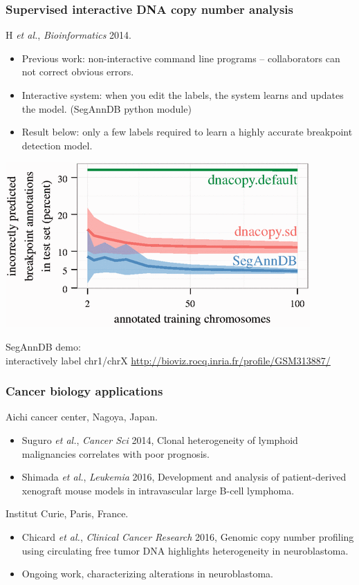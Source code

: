 \documentclass{beamer}
\begin{document}
\begin{frame}
  \frametitle{Supervised interactive DNA copy number analysis}
  H {\it et al.}, {\it Bioinformatics} 2014.

  \begin{itemize}
  \item Previous work: non-interactive command line programs
    -- collaborators can not correct obvious
    errors.
  \item Interactive system: when you edit the labels, the system
    learns and updates the model. (SegAnnDB python module)
  \item Result below: only a few labels required to learn a highly accurate
    breakpoint detection model.
  \end{itemize}
  \begin{minipage}{0.5\linewidth}
    \includegraphics[width=\textwidth]{SegAnnDB-test-error-decreases}
  \end{minipage}
  \begin{minipage}[0.5\linewidth]{0.48\linewidth}
SegAnnDB demo:\\interactively label chr1/chrX
  \url{http://bioviz.rocq.inria.fr/profile/GSM313887/}
  \end{minipage}
\end{frame} 

\begin{frame}
  \frametitle{Cancer biology applications}
  Aichi cancer center, Nagoya, Japan.
  \begin{itemize}
  \item Suguro {\it et al.}, {\it Cancer Sci} 2014, Clonal
    heterogeneity of lymphoid malignancies correlates with poor
    prognosis.
  \item Shimada {\it et al.}, {\it Leukemia} 2016, Development and
    analysis of patient-derived xenograft mouse models in
    intravascular large B-cell lymphoma.
  \end{itemize}
  Institut Curie, Paris, France.
  \begin{itemize}
  \item Chicard {\it et al.}, {\it Clinical Cancer Research} 2016,
    Genomic copy number profiling using circulating free tumor DNA
    highlights heterogeneity in neuroblastoma.
  \item Ongoing work, characterizing alterations in neuroblastoma.
  \end{itemize}
\end{frame}
\end{document}
